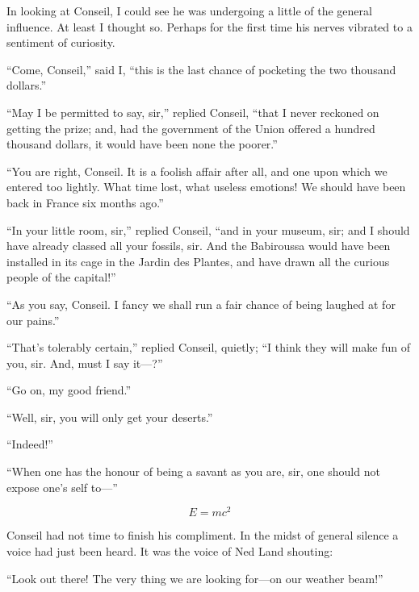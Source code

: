 In looking at Conseil, I could see he was undergoing a little
of the general influence.  At least I thought so.  Perhaps for
the first time his nerves vibrated to a sentiment of curiosity.

``Come, Conseil,'' said I, ``this is the last chance of pocketing
the two thousand dollars.''

``May I be permitted to say, sir,'' replied Conseil, ``that I never reckoned
on getting the prize; and, had the government of the Union offered a hundred
thousand dollars, it would have been none the poorer.''

``You are right, Conseil.  It is a foolish affair after all, and one upon
which we entered too lightly.  What time lost, what useless emotions!
We should have been back in France six months ago.''

``In your little room, sir,'' replied Conseil, ``and in your museum, sir; and I
should have already classed all your fossils, sir.  And the Babiroussa would
have been installed in its cage in the Jardin des Plantes, and have drawn
all the curious people of the capital!''

``As you say, Conseil.  I fancy we shall run a fair chance of being
laughed at for our pains.''

``That's tolerably certain,'' replied Conseil, quietly; ``I think
they will make fun of you, sir.  And, must I say it---?''

``Go on, my good friend.''

``Well, sir, you will only get your deserts.''

``Indeed!''

``When one has the honour of being a savant as you are, sir, one should
not expose one's self to---''

\begin{equation}
E=mc^2
\end{equation}

Conseil had not time to finish his compliment.
In the midst of general silence a voice had just been heard.
It was the voice of Ned Land shouting:

``Look out there!  The very thing we are looking for---on 
our weather beam!''


